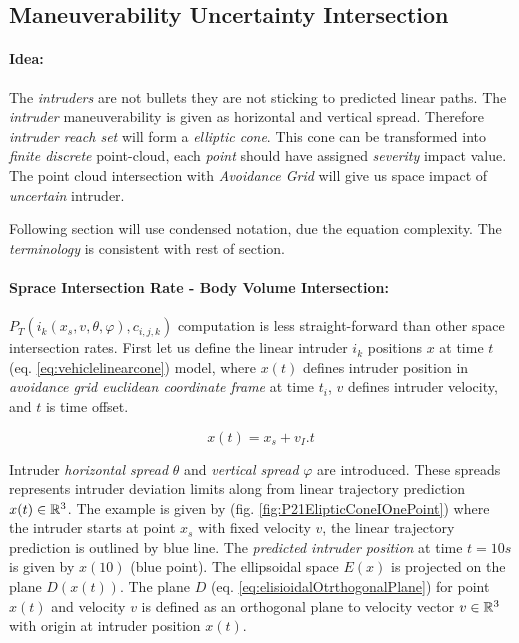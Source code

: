 \newpage
\subsection{Maneuverability Uncertainty Intersection}\label{s:uncertaintyIntersection}
\paragraph{Idea:} The \emph{intruders} are not bullets they are not sticking to predicted linear paths. The \emph{intruder} maneuverability is given as horizontal and vertical spread. Therefore \emph{intruder reach set} will form a \emph{elliptic cone}. This cone can be transformed into \emph{finite discrete } point-cloud, each \emph{point} should have assigned \emph{severity} impact value.  The point cloud intersection with  \emph{Avoidance Grid} will give us space impact of \emph{uncertain} intruder.


\begin{note}
    Following section will use condensed notation, due the equation complexity. The \emph{terminology} is consistent with rest of section. 
\end{note}

\paragraph{Sprace Intersection Rate - Body Volume Intersection:} $P_T(i_k({x}_s,{v},\theta,\varphi),c_{i,j,k})$
computation is less straight-forward than other space intersection rates. First let us define the linear intruder $i_k$ positions ${x}$ at time $t$ (eq. \ref{eq:vehiclelinearcone}) model, where ${x}(t)$ defines intruder position in \emph{avoidance grid euclidean coordinate frame} at time $t_i$, ${v}$ defines intruder velocity, and $t$ is time offset.

\begin{equation}\label{eq:vehiclelinearcone}
    x(t)=x_s + v_I.t
\end{equation}

\noindent Intruder \emph{horizontal spread} $\theta$ and \emph{vertical spread} $\varphi$ are introduced. These spreads represents intruder deviation limits along from linear trajectory prediction ${x}(t)\in\mathbb{R}^3$. The example is given by (fig. \ref{fig:P21ElipticConeIOnePoint}) where the intruder starts at point ${x}_s$ with fixed velocity $v$, the linear trajectory prediction is outlined by blue line. The \emph{predicted intruder position} at time $t=10s$ is given by ${x}(10)$ (blue point). The ellipsoidal space $E({x})$ is projected on the plane $D({x}(t))$. The plane $D$ (eq. \ref{eq:elisioidalOtrthogonalPlane}) for point ${x}(t)$ and velocity ${v}$ is defined as an orthogonal plane to velocity vector ${v}\in\mathbb{R}^3$ with origin at intruder position ${x}(t)$. 

